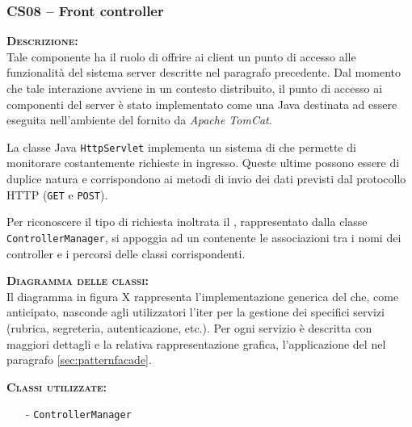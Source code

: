 \subsubsection{CS08 -- Front controller}
\begin{description}
	\item{\scshape\bfseries Descrizione:}\\
Tale componente ha il ruolo di offrire ai client un punto di accesso alle funzionalità del sistema server descritte nel paragrafo precedente. Dal momento che tale interazione avviene in un contesto distribuito, il punto di accesso ai componenti del server è stato implementato come una  Java destinata ad essere eseguita nell'ambiente del  fornito da \textit{Apache TomCat}.

La classe Java \texttt{HttpServlet} implementa un sistema di  che permette di monitorare costantemente richieste in ingresso. Queste ultime possono essere di duplice natura e corrispondono ai metodi di invio dei dati previsti dal protocollo HTTP (\texttt{GET} e \texttt{POST}).

Per riconoscere il tipo di richiesta inoltrata il , rappresentato dalla classe \texttt{ControllerManager}, si appoggia ad un  contenente le associazioni tra i nomi dei controller e i percorsi delle classi corrispondenti.

	\item{\scshape\bfseries Diagramma delle classi:}\\

Il diagramma in figura X rappresenta l'implementazione generica del  che, come anticipato, nasconde agli utilizzatori l'iter per la gestione dei specifici servizi (rubrica, segreteria, autenticazione, etc.). Per ogni servizio è descritta con maggiori dettagli e la relativa rappresentazione grafica, l'applicazione del  nel paragrafo \vref{sec:patternfacade}.

\item{\scshape\bfseries Classi utilizzate:}\\
	\begin{itemize}[noitemsep,nolistsep]
	  \item[-] \texttt{ControllerManager}
	\end{itemize}

\end{description}
